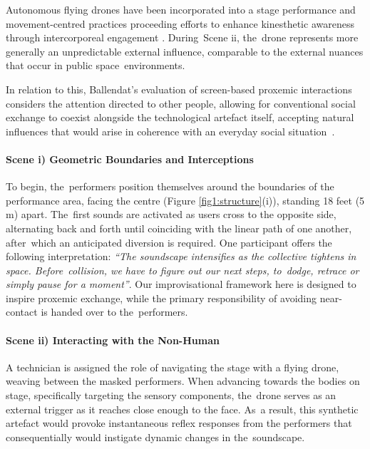 Autonomous flying drones have been incorporated into a stage performance \citep{eriksson_dancing_2019} and movement-centred practices \citep{la_delfa_drone_2020} proceeding efforts to enhance kinesthetic awareness through intercorporeal engagement \citep{tezza_state---art_2019}. During~Scene ii, the~drone represents more generally an unpredictable external influence, comparable to the external nuances that occur in public space~environments.

In relation to this, Ballendat's %
evaluation of screen-based proxemic interactions considers the attention directed to other people, allowing for conventional social exchange to coexist alongside the technological artefact itself, accepting natural influences that would arise in coherence with an everyday social situation~\cite{ballendat_proxemic_2010}.

\paragraph{Scene i) Geometric Boundaries and Interceptions}

To begin, the~performers position themselves around the boundaries of the performance area, facing the centre (Figure \ref{fig1:structure}(i)), standing 18 feet (5 m) apart. The~first sounds are activated as users cross to the opposite side, alternating back and forth until coinciding with the linear path of one another, after~which an anticipated diversion is required. One participant offers the following interpretation: \textit{``The soundscape intensifies as the collective tightens in space. Before~collision, we have to figure out our next steps, to~dodge, retrace or simply pause for a moment''}. Our improvisational framework here is designed to inspire proxemic exchange, while the primary responsibility of avoiding near-contact is handed over to the~performers.

\paragraph{Scene ii) Interacting with the Non-Human}

A technician is assigned the role of navigating the stage with a flying drone, weaving between the masked performers. When advancing towards the bodies on stage, specifically targeting the sensory components, the~drone serves as an external trigger as it reaches close enough to the face. As~a result, this synthetic artefact would provoke instantaneous reflex responses from the performers that consequentially would instigate dynamic changes in the~soundscape.

